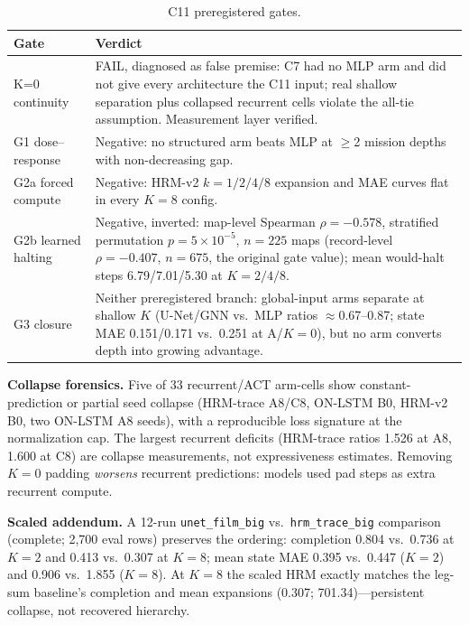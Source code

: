 \documentclass[letterpaper]{article} %
\newcommand{\stage}[1]{\textsc{#1}}
\begin{document}
\begin{table}[h]
\centering
\footnotesize
\begin{tabular}{@{}lp{5.2cm}@{}}
\toprule
Gate & Verdict \\
\midrule
K=0 continuity & FAIL, diagnosed as false premise: \stage{C7} had no MLP arm and did not give every architecture the \stage{C11} input; real shallow separation plus collapsed recurrent cells violate the all-tie assumption. Measurement layer verified. \\
G1 dose--response & Negative: no structured arm beats MLP at $\geq$2 mission depths with non-decreasing gap. \\
G2a forced compute & Negative: HRM-v2 $k{=}1/2/4/8$ expansion and MAE curves flat in every $K{=}8$ config. \\
G2b learned halting & Negative, inverted: map-level Spearman $\rho{=}-0.578$, stratified permutation $p{=}5{\times}10^{-5}$, $n{=}225$ maps (record-level $\rho{=}-0.407$, $n{=}675$, the original gate value); mean would-halt steps 6.79/7.01/5.30 at $K{=}2/4/8$. \\
G3 closure & Neither preregistered branch: global-input arms separate at shallow $K$ (U-Net/GNN vs.\ MLP ratios $\approx$0.67--0.87; state MAE 0.151/0.171 vs.\ 0.251 at A/$K{=}0$), but no arm converts depth into growing advantage. \\
\bottomrule
\end{tabular}
\caption{\stage{C11} preregistered gates.}
\label{tab:c11gates}
\end{table}

\textbf{Collapse forensics.} Five of 33 recurrent/ACT arm-cells show constant-prediction or partial seed collapse (HRM-trace A8/C8, ON-LSTM B0, HRM-v2 B0, two ON-LSTM A8 seeds), with a reproducible loss signature at the normalization cap. The largest recurrent deficits (HRM-trace ratios 1.526 at A8, 1.600 at C8) are collapse measurements, not expressiveness estimates. Removing $K{=}0$ padding \emph{worsens} recurrent predictions: models used pad steps as extra recurrent compute.

\textbf{Scaled addendum.} A 12-run \texttt{unet\_film\_big} vs.\ \texttt{hrm\_trace\_big} comparison (complete; 2{,}700 eval rows) preserves the ordering: completion 0.804 vs.\ 0.736 at $K{=}2$ and 0.413 vs.\ 0.307 at $K{=}8$; mean state MAE 0.395 vs.\ 0.447 ($K{=}2$) and 0.906 vs.\ 1.855 ($K{=}8$). At $K{=}8$ the scaled HRM exactly matches the leg-sum baseline's completion and mean expansions (0.307; 701.34)---persistent collapse, not recovered hierarchy.
\end{document}
